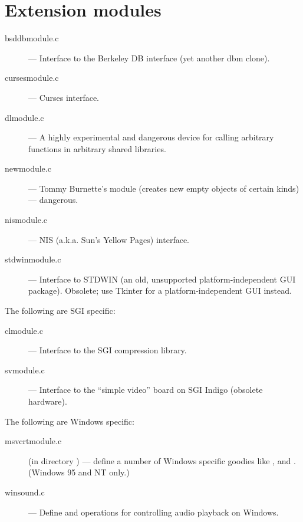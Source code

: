 \section{Extension modules}

\begin{description}
\item[bsddbmodule.c]
--- Interface to the Berkeley DB interface (yet another
dbm clone).

\item[cursesmodule.c]
--- Curses interface.

\item[dlmodule.c]
---  A highly experimental and dangerous device for calling
arbitrary \C{} functions in arbitrary shared libraries.

\item[newmodule.c]
--- Tommy Burnette's  module (creates new empty objects of
certain kinds) --- dangerous.

\item[nismodule.c]
--- NIS (a.k.a. Sun's Yellow Pages) interface.

\item[stdwinmodule.c]
--- Interface to STDWIN (an old, unsupported
platform-independent GUI package).  Obsolete; use Tkinter for a
platform-independent GUI instead.
\end{description}

The following are SGI specific:

\begin{description}
\item[clmodule.c]
--- Interface to the SGI compression library.

\item[svmodule.c]
--- Interface to the ``simple video'' board on SGI Indigo
(obsolete hardware).
\end{description}

The following are Windows specific:

\begin{description}
\item[msvcrtmodule.c]
(in directory ) --- define a number of Windows
specific goodies like ,  and
.  (Windows 95 and NT only.)

\item[winsound.c]
--- Define  and  operations for
controlling audio playback on Windows.
\end{description}
